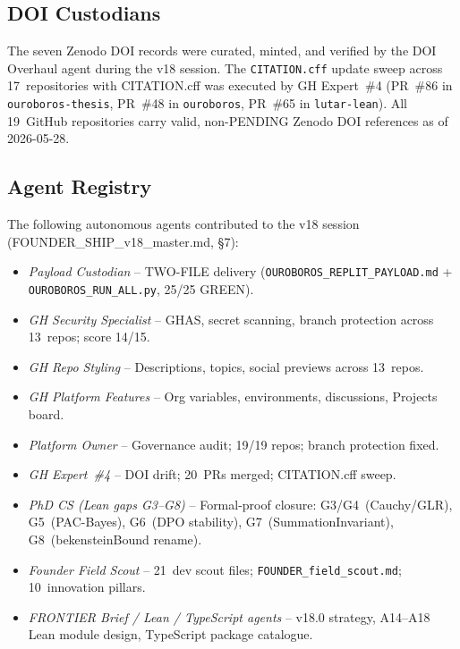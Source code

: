 \subsection{DOI Custodians}

The seven Zenodo DOI records were curated, minted, and verified by the
DOI Overhaul agent during the v18 session.
The \texttt{CITATION.cff} update sweep across 17~repositories with
CITATION.cff was executed by GH Expert~\#4 (PR~\#86 in
\texttt{ouroboros-thesis}, PR~\#48 in \texttt{ouroboros},
PR~\#65 in \texttt{lutar-lean}).
All 19~GitHub repositories carry valid, non-PENDING Zenodo DOI references
as of 2026-05-28.

\subsection{Agent Registry}

The following autonomous agents contributed to the v18 session
(FOUNDER\_SHIP\_v18\_master.md, \S{}7):

\begin{itemize}
  \item \textit{Payload Custodian} -- TWO-FILE delivery
    (\texttt{OUROBOROS\_REPLIT\_PAYLOAD.md} + \texttt{OUROBOROS\_RUN\_ALL.py},
    25/25 GREEN).
  \item \textit{GH Security Specialist} -- GHAS, secret scanning,
    branch protection across 13~repos; score 14/15.
  \item \textit{GH Repo Styling} -- Descriptions, topics, social previews
    across 13~repos.
  \item \textit{GH Platform Features} -- Org variables, environments,
    discussions, Projects board.
  \item \textit{Platform Owner} -- Governance audit; 19/19 repos;
    branch protection fixed.
  \item \textit{GH Expert~\#4} -- DOI drift; 20~PRs merged; CITATION.cff
    sweep.
  \item \textit{PhD CS (Lean gaps G3--G8)} -- Formal-proof closure:
    G3/G4~(Cauchy/GLR), G5~(PAC-Bayes), G6~(DPO stability),
    G7~(SummationInvariant), G8~(bekensteinBound rename).
  \item \textit{Founder Field Scout} -- 21~dev scout files;
    \texttt{FOUNDER\_field\_scout.md}; 10~innovation pillars.
  \item \textit{FRONTIER Brief / Lean / TypeScript agents} --
    v18.0 strategy, A14--A18 Lean module design, TypeScript package
    catalogue.
\end{itemize}

